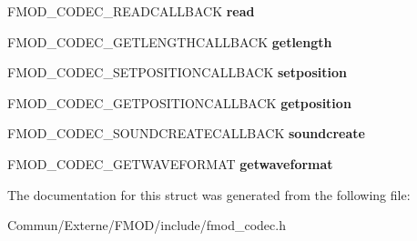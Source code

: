 \begin{DoxyCompactItemize}
\item 
F\+M\+O\+D\+\_\+\+C\+O\+D\+E\+C\+\_\+\+R\+E\+A\+D\+C\+A\+L\+L\+B\+A\+CK {\bfseries read}\hypertarget{struct_f_m_o_d___c_o_d_e_c___d_e_s_c_r_i_p_t_i_o_n_ac64375412d9cd6e73fdf0d9aea0ca37a}{}\label{struct_f_m_o_d___c_o_d_e_c___d_e_s_c_r_i_p_t_i_o_n_ac64375412d9cd6e73fdf0d9aea0ca37a}

\item 
F\+M\+O\+D\+\_\+\+C\+O\+D\+E\+C\+\_\+\+G\+E\+T\+L\+E\+N\+G\+T\+H\+C\+A\+L\+L\+B\+A\+CK {\bfseries getlength}\hypertarget{struct_f_m_o_d___c_o_d_e_c___d_e_s_c_r_i_p_t_i_o_n_a83a086b8d6537aa0c7c271fc2adb4fbf}{}\label{struct_f_m_o_d___c_o_d_e_c___d_e_s_c_r_i_p_t_i_o_n_a83a086b8d6537aa0c7c271fc2adb4fbf}

\item 
F\+M\+O\+D\+\_\+\+C\+O\+D\+E\+C\+\_\+\+S\+E\+T\+P\+O\+S\+I\+T\+I\+O\+N\+C\+A\+L\+L\+B\+A\+CK {\bfseries setposition}\hypertarget{struct_f_m_o_d___c_o_d_e_c___d_e_s_c_r_i_p_t_i_o_n_a7d60d107fe48efef977f2a883fd097be}{}\label{struct_f_m_o_d___c_o_d_e_c___d_e_s_c_r_i_p_t_i_o_n_a7d60d107fe48efef977f2a883fd097be}

\item 
F\+M\+O\+D\+\_\+\+C\+O\+D\+E\+C\+\_\+\+G\+E\+T\+P\+O\+S\+I\+T\+I\+O\+N\+C\+A\+L\+L\+B\+A\+CK {\bfseries getposition}\hypertarget{struct_f_m_o_d___c_o_d_e_c___d_e_s_c_r_i_p_t_i_o_n_a3e532db698aa1f571ddb4afb20f53682}{}\label{struct_f_m_o_d___c_o_d_e_c___d_e_s_c_r_i_p_t_i_o_n_a3e532db698aa1f571ddb4afb20f53682}

\item 
F\+M\+O\+D\+\_\+\+C\+O\+D\+E\+C\+\_\+\+S\+O\+U\+N\+D\+C\+R\+E\+A\+T\+E\+C\+A\+L\+L\+B\+A\+CK {\bfseries soundcreate}\hypertarget{struct_f_m_o_d___c_o_d_e_c___d_e_s_c_r_i_p_t_i_o_n_a9004a5424a76ae31edc173015a20233e}{}\label{struct_f_m_o_d___c_o_d_e_c___d_e_s_c_r_i_p_t_i_o_n_a9004a5424a76ae31edc173015a20233e}

\item 
F\+M\+O\+D\+\_\+\+C\+O\+D\+E\+C\+\_\+\+G\+E\+T\+W\+A\+V\+E\+F\+O\+R\+M\+AT {\bfseries getwaveformat}\hypertarget{struct_f_m_o_d___c_o_d_e_c___d_e_s_c_r_i_p_t_i_o_n_a81c4079df89138532f9c435ebd0d1f64}{}\label{struct_f_m_o_d___c_o_d_e_c___d_e_s_c_r_i_p_t_i_o_n_a81c4079df89138532f9c435ebd0d1f64}

\end{DoxyCompactItemize}


The documentation for this struct was generated from the following file\+:\begin{DoxyCompactItemize}
\item 
Commun/\+Externe/\+F\+M\+O\+D/include/fmod\+\_\+codec.\+h\end{DoxyCompactItemize}
